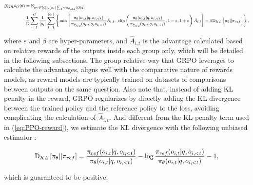 \begin{itemize}[topsep=0pt]
\begin{itemize}[topsep=0pt]
\begin{equation}
\footnotesize
\begin{split}
    \mathcal{J}_{GRPO}(\theta) &= \mathbb{E}_{q \sim P(Q), \{o_i\}_{i=1}^G \sim \pi_{\theta_{old}}(O|q)}  \\
    & \frac{1}{G}\sum_{i=1}^G \frac{1}{|o_i|} \sum_{t=1}^{|o_i|} \left\{ \min \left[ \frac{\pi_\theta(o_{i,t} | q, o_{i,<t})}{\pi_{\theta_{old}}(o_{i,t} | q, o_{i,<t})} \hat{A}_{i,t},\ \text{clip} \left( \frac{\pi_\theta(o_{i,t} | q, o_{i,<t})}{\pi_{\theta_{old}}(o_{i,t} | q, o_{i,<t})}, 1 - \varepsilon, 1 + \varepsilon \right)  \hat{A}_{i,t} \right] - \beta \mathbb{D}_{KL}\left[\pi_{\theta} || \pi_{ref}\right]\right\} ,
\end{split}
\label{eq:GRPO-obj}
\end{equation}

where $\varepsilon$ and $\beta$ are hyper-parameters, and $\hat{A}_{i,t}$  is the advantage calculated based on relative rewards of the outputs inside each group only, which will be detailed in the following subsections. The group relative way that GRPO leverages to calculate the advantages, aligns well with the comparative nature of rewards models,  as reward models are typically trained on datasets of comparisons between outputs on the same question. Also note that, instead of adding KL penalty in the reward, GRPO regularizes by directly adding the KL divergence between the trained policy and the reference policy to the loss, avoiding complicating the calculation of  $\hat{A}_{i,t}$. And different from the KL penalty term used in (\ref{eq:PPO-reward}), we estimate the KL divergence with the following unbiased estimator \citep{kl_approx}:

\begin{equation}
\small
    \mathbb{D}_{KL}\left[\pi_{\theta} || \pi_{ref}\right] = \frac{\pi_{ref}(o_{i,t}|q,o_{i,<t})}{\pi_{\theta}(o_{i,t}|q,o_{i,<t})}- \log\frac{\pi_{ref}(o_{i,t}|q,o_{i,<t})}{\pi_{\theta}(o_{i,t}|q,o_{i,<t})} - 1,
\end{equation}

which is guaranteed to be positive.


\end{itemize}
\end{itemize}
